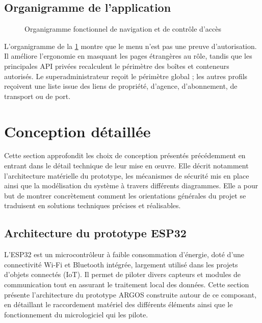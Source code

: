 \subsection{Organigramme de l'application}

\begin{figure}[H]
    \centering
    \resizebox{\textwidth}{!}{%
        
    }
    \caption{Organigramme fonctionnel de navigation et de contrôle d'accès}
    \label{fig-argos-organigramme-application}
    \tablesourcepromoteurs
\end{figure}

L'organigramme de la \cref{fig-argos-organigramme-application} montre que le
menu n'est pas une preuve d'autorisation. Il améliore l'ergonomie en masquant
les pages étrangères au rôle, tandis que les principales API privées
recalculent le périmètre des boîtes et conteneurs autorisés. Le
superadministrateur reçoit le périmètre
global ; les autres profils reçoivent une liste issue des liens de propriété,
d'agence, d'abonnement, de transport ou de port.

\section{Conception détaillée}

Cette section approfondit les choix de conception présentés précédemment en entrant dans le détail technique de leur mise en œuvre. Elle décrit notamment l'architecture matérielle du prototype, les mécanismes de sécurité mis en place ainsi que la modélisation du système à travers différents diagrammes. Elle a pour but de montrer concrètement comment les orientations générales du projet se traduisent en solutions techniques précises et réalisables.

\subsection{Architecture du prototype ESP32}

L'ESP32 est un microcontrôleur à faible consommation d'énergie, doté d'une connectivité Wi-Fi et Bluetooth intégrée, largement utilisé dans les projets d'objets connectés (IoT). Il permet de piloter divers capteurs et modules de communication tout en assurant le traitement local des données. Cette section présente l'architecture du prototype ARGOS construite autour de ce composant, en détaillant le raccordement matériel des différents éléments ainsi que le fonctionnement du micrologiciel qui les pilote.

